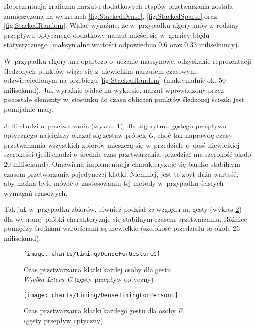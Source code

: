     Reprezentacja graficzna narzutu dodatkowych etapów przetwarzania została zamieszczona na wykresach \ref{fig:StackedDense}, \ref{fig:StackedSparse} oraz \ref{fig:StackedRandom}. Widać wyraźnie, że w~przypadku algorytmów z~rodziny przepływu optycznego dodatkowy narzut mieści się w~granicy błędu statystycznego (maksymalne wartości odpowiednio $0.6$ oraz $0.33$ milisekundy).

    W~przypadku algorytmu opartego o~uczenie maszynowe, odzyskanie reprezentacji śledzonych punktów wiąże się z~niewielkim narzutem czasowym, odzwierciedlonym na przebiegu \ref{fig:StackedRandom} (maksymalnie ok. $50$ milisekund). Jak wyraźnie widać na wykresie, narzut wprowadzony przez pozostałe elementy w~stosunku do czasu obliczeń punktów śledzonej ścieżki jest pomijalnie mały.

    Jeśli chodzi o~przetwarzanie (wykres \ref{fig:DenseForGestureC}), dla algorytmu gęstego przepływu optycznego najcięższy okazał się zestaw próbek \textit{G}, choć tak naprawdę czasy przetwarzania wszystkich zbiorów mieszczą się w~przedziale o~dość niewielkiej szerokości (jeśli chodzi o~średnie czas przetwarzania, przedział ma szerokość około $20$ milisekund). Omawiana implementacja charakteryzuje się bardzo stabilnym czasem przetwarzania pojedynczej klatki. Niemniej, jest to zbyt duża wartość, aby można było mówić o~zastosowaniu tej metody w~przypadku ścisłych wymagań czasowych.

    Tak jak w~przypadku zbiorów, również podział ze względu na gesty (wykres \ref{fig:DenseTimingForPersonE}) dla wybranej próbki charakteryzuje się stabilnym czasem przetwarzania. Różnice pomiędzy średnimi wartościami są niewielkie (szerokość przedziału to około 25 milisekund).

      \begin{figure}[!ht]
        \centering
        \texttt{[image: charts/timing/DenseForGestureC]}
        \caption[Czas przetwarzania klatki każdej osoby dla gestu C (gęsty przepływ optyczny)]
                {Czas przetwarzania klatki każdej osoby dla gestu \\\textit{Wielka Litera C} (gęsty przepływ optyczny)}
        \label{fig:DenseForGestureC}
      \end{figure}

      \begin{figure}[!ht]
        \centering
        \texttt{[image: charts/timing/DenseTimingForPersonE]}
        \caption[Czas przetwarzania klatki każdego gestu dla osoby E (gęsty przepływ optyczny)]
                {Czas przetwarzania klatki każdego gestu dla osoby \textit{E}\\(gęsty przepływ optyczny)}
        \label{fig:DenseTimingForPersonE}
      \end{figure}

